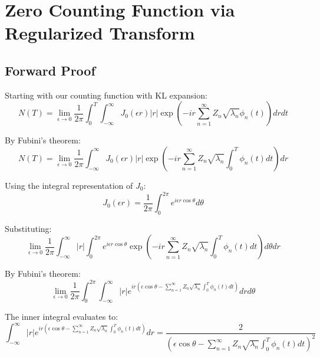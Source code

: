 \documentclass{article}
\begin{document}
\section{Zero Counting Function via Regularized Transform}

\subsection{Forward Proof}
Starting with our counting function with KL expansion:
\begin{equation}
    N(T) = \lim_{\epsilon \to 0} \frac{1}{2\pi} \int_0^T \int_{-\infty}^{\infty} J_0(\epsilon r)|r| \exp\left(-ir\sum_{n=1}^{\infty} Z_n \sqrt{\lambda_n} \phi_n(t)\right) dr dt
\end{equation}

By Fubini's theorem:
\begin{equation}
    N(T) = \lim_{\epsilon \to 0} \frac{1}{2\pi} \int_{-\infty}^{\infty} J_0(\epsilon r)|r| \exp\left(-ir\sum_{n=1}^{\infty} Z_n \sqrt{\lambda_n} \int_0^T \phi_n(t) dt\right) dr
\end{equation}

Using the integral representation of $J_0$:
\begin{equation}
    J_0(\epsilon r) = \frac{1}{2\pi} \int_0^{2\pi} e^{i\epsilon r\cos\theta} d\theta
\end{equation}

Substituting:
\begin{equation}
    \lim_{\epsilon \to 0} \frac{1}{2\pi} \int_{-\infty}^{\infty} |r| \int_0^{2\pi} e^{i\epsilon r\cos\theta} \exp\left(-ir\sum_{n=1}^{\infty} Z_n \sqrt{\lambda_n} \int_0^T \phi_n(t) dt\right) d\theta dr
\end{equation}

By Fubini's theorem:
\begin{equation}
    \lim_{\epsilon \to 0} \frac{1}{2\pi} \int_0^{2\pi} \int_{-\infty}^{\infty} |r| e^{ir(\epsilon\cos\theta - \sum_{n=1}^{\infty} Z_n \sqrt{\lambda_n} \int_0^T \phi_n(t) dt)} dr d\theta
\end{equation}

The inner integral evaluates to:
\begin{equation}
    \int_{-\infty}^{\infty} |r| e^{ir(\epsilon\cos\theta - \sum_{n=1}^{\infty} Z_n \sqrt{\lambda_n} \int_0^T \phi_n(t) dt)} dr = \frac{2}{(\epsilon\cos\theta - \sum_{n=1}^{\infty} Z_n \sqrt{\lambda_n} \int_0^T \phi_n(t) dt)^2}
\end{equation}
\end{document}
